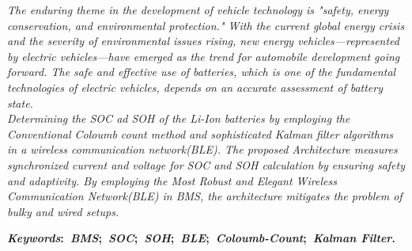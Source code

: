 \thispagestyle{empty} 

\noindent \textit{
    The enduring theme in the development of vehicle technology is "safety, energy conservation, and environmental protection." With the current global energy crisis and the severity of environmental issues rising, new energy vehicles—represented by electric vehicles—have emerged as the trend for automobile development going forward. The safe and effective use of batteries, which is one of the fundamental technologies of electric vehicles, depends on an accurate assessment of battery state.\\
    
    Determining the SOC ad SOH of the Li-Ion batteries by employing the Conventional Coloumb count method and sophisticated Kalman filter algorithms in a wireless communication network(BLE). 
    The proposed Architecture measures synchronized current and voltage for SOC and SOH calculation by ensuring safety and adaptivity. 
    By employing the Most Robust and Elegant Wireless Communication Network(BLE) in BMS, the architecture mitigates the problem of bulky and wired setups.
}




\vspace{5mm}
\noindent\textbf{\textit{Keywords}:~\textit{BMS};~\textit{SOC};~\textit{SOH};~\textit{BLE};~\textit{Coloumb-Count};~\textit{Kalman Filter}.}
